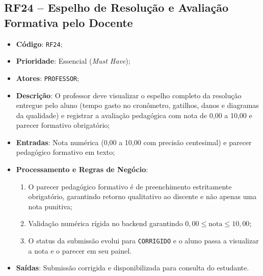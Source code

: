 \subsection{RF24 -- Espelho de Resolução e Avaliação Formativa pelo Docente}
\begin{itemize}
    \item \textbf{Código}: \texttt{RF24};
    \item \textbf{Prioridade}: Essencial (\textit{Must Have});
    \item \textbf{Atores}: \texttt{PROFESSOR};
    \item \textbf{Descrição}: O professor deve visualizar o espelho completo da resolução entregue pelo aluno (tempo gasto no cronômetro, gatilhos, danos e diagramas da qualidade) e registrar a avaliação pedagógica com nota de 0,00 a 10,00 e parecer formativo obrigatório;
    \item \textbf{Entradas}: Nota numérica (0,00 a 10,00 com precisão centesimal) e parecer pedagógico formativo em texto;
    \item \textbf{Processamento e Regras de Negócio}:
    \begin{enumerate}
        \item O parecer pedagógico formativo é de preenchimento estritamente obrigatório, garantindo retorno qualitativo ao discente e não apenas uma nota punitiva;
        \item Validação numérica rígida no backend garantindo $0,00 \le \text{nota} \le 10,00$;
        \item O status da submissão evolui para \texttt{CORRIGIDO} e o aluno passa a visualizar a nota e o parecer em seu painel.
    \end{enumerate}
    \item \textbf{Saídas}: Submissão corrigida e disponibilizada para consulta do estudante.
\end{itemize}


